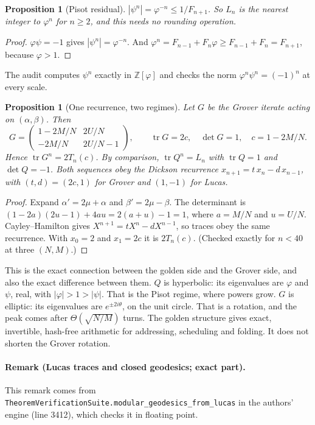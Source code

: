 \documentclass[11pt]{article}
\newtheorem{proposition}[theorem]{Proposition}
\theoremstyle{definition}
\newcommand{\Z}{\mathbb{Z}}
\newcommand{\tr}{\operatorname{tr}}
\newcommand{\code}[1]{\texttt{\small #1}}
\begin{document}
\begin{proposition}[Pisot residual]
$|\psi^n|=\varphi^{-n}\le1/F_{n+1}$. So $L_n$ is the nearest integer to $\varphi^n$ for $n\ge2$, and this needs no
rounding operation.
\end{proposition}
\begin{proof}
$\varphi\psi=-1$ gives $|\psi^n|=\varphi^{-n}$. And $\varphi^n=F_{n-1}+F_n\varphi\ge F_{n-1}+F_n=F_{n+1}$, because
$\varphi>1$.
\end{proof}
The audit computes $\psi^n$ exactly in $\Z[\varphi]$ and checks the norm $\varphi^n\psi^n=(-1)^n$ at every scale.

\begin{proposition}[One recurrence, two regimes]\label{prop:dickson}
Let $G$ be the Grover iterate acting on $(\alpha,\beta)$. Then
\[ G=\begin{pmatrix}1-2M/N&2U/N\\-2M/N&2U/N-1\end{pmatrix},\qquad \tr G=2c,\quad \det G=1,\quad c=1-2M/N. \]
Hence $\tr G^n=2T_n(c)$. By comparison, $\tr Q^n=L_n$ with $\tr Q=1$ and $\det Q=-1$. Both sequences obey the Dickson
recurrence $x_{n+1}=t\,x_n-d\,x_{n-1}$, with $(t,d)=(2c,1)$ for Grover and $(1,-1)$ for Lucas.
\end{proposition}
\begin{proof}
Expand $\alpha'=2\mu+\alpha$ and $\beta'=2\mu-\beta$. The determinant is $(1-2a)(2u-1)+4au=2(a+u)-1=1$, where
$a=M/N$ and $u=U/N$. Cayley--Hamilton gives $X^{n+1}=tX^n-dX^{n-1}$, so traces obey the same recurrence. With
$x_0=2$ and $x_1=2c$ it is $2T_n(c)$. (Checked exactly for $n<40$ at three $(N,M)$.)
\end{proof}
This is the exact connection between the golden side and the Grover side, and also the exact difference between them.
$Q$ is hyperbolic: its eigenvalues are $\varphi$ and $\psi$, real, with $|\varphi|>1>|\psi|$. That is the Pisot regime,
where powers grow. $G$ is elliptic: its eigenvalues are $e^{\pm2i\theta}$, on the unit circle. That is a rotation,
and the peak comes after $\Theta(\sqrt{N/M})$ turns. The golden structure gives exact, invertible, hash-free
arithmetic for addressing, scheduling and folding. It does not shorten the Grover rotation.

\paragraph{Remark (Lucas traces and closed geodesics; exact part).} This remark comes from
\code{TheoremVerificationSuite.modular\_geodesics\_from\_lucas} in the authors' engine (line 3412), which checks it in
floating point.
\end{document}
